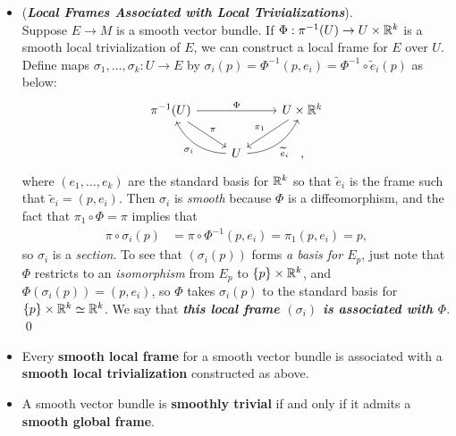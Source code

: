 \documentclass[11pt]{article}
\begin{document}
\begin{itemize}
\item \begin{remark} (\textbf{\emph{Local Frames Associated with Local Trivializations}}).\\
Suppose $E \rightarrow M$  is a smooth vector bundle. If $\Phi: \pi^{-1}(U) \rightarrow U \times {\mathbb R}^{k}$ is a smooth local trivialization of $E$, we can construct a local frame for $E$ over $U$.  Define maps $\sigma_1, \ldots, \sigma_k: U \rightarrow E$ by $\sigma_i(p) = \Phi^{-1}(p, e_i) = \Phi^{-1} \circ \widetilde{e}_i(p)$ as below:
\[
  \begin{tikzcd}
    \pi^{-1}(U) \arrow{rr}{\Phi} \arrow{dr}{\pi} &   &U \times \bR^{k} \arrow[swap]{dl}{\pi_1} \\
                                                                            &   U \arrow[ul, bend left, "\sigma_i"]  \arrow[ur, swap, bend right , "\widetilde{e}_i"] &,
  \end{tikzcd}
\]  where $(e_1,\ldots, e_k)$  are the standard basis for ${\mathbb R}^k$ so that $\widetilde{e}_i$ is the frame such that $\widetilde{e}_i = (p, e_i)$. Then $\sigma_i$ is \textit{smooth} because $\Phi$ is a diffeomorphism, and the fact that $\pi_1 \circ \Phi = \pi$ implies that
\begin{align*}
\pi \circ \sigma_i(p) &=  \pi \circ  \Phi^{-1}(p, e_i) = \pi_1(p, e_i) = p,
\end{align*} so $\sigma_i$ is a \emph{section}. To see that $(\sigma_i(p))$ forms \emph{a basis for $E_p$}, just note that $\Phi$ restricts to an \emph{isomorphism} from $E_p$ to $\left\{p\right\} \times {\mathbb R}^k$, and $\Phi(\sigma_i(p)) = (p, e_i)$, so $\Phi$ takes $\sigma_i(p)$ to the standard basis for $\left\{p\right\} \times {\mathbb R}^k \simeq {\mathbb R}^{k}$. We say that \emph{\textbf{this local frame $(\sigma_i)$ is associated with $\Phi$}}. \qed
\end{remark}

\item \begin{proposition}
Every \textbf{smooth local frame} for a smooth vector bundle is associated with a \textbf{smooth local trivialization} constructed as above.
\end{proposition}


\item \begin{corollary}
A smooth vector bundle is \textbf{smoothly trivial} if and only if it admits a \textbf{smooth global frame}.
\end{corollary}


\end{itemize}
\end{document}

